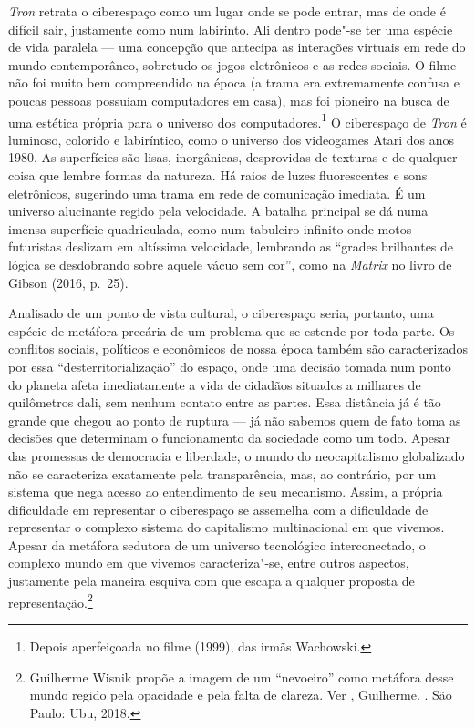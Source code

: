 \emph{Tron} retrata o ciberespaço como um lugar onde se pode entrar, mas
de onde é difícil sair, justamente como num labirinto. Ali dentro
pode"-se ter uma espécie de vida paralela --- uma concepção que antecipa
as interações virtuais em rede do mundo contemporâneo, sobretudo os
jogos eletrônicos e as redes sociais. O filme não foi muito bem
compreendido na época (a trama era extremamente confusa e poucas pessoas
possuíam computadores em casa), mas foi pioneiro na busca de uma
estética própria para o universo dos computadores.\footnote{Depois
  aperfeiçoada no filme {} (1999), das irmãs Wachowski.} O
ciberespaço de \emph{Tron} é luminoso, colorido e labiríntico, como o
universo dos videogames Atari dos anos 1980. As superfícies são lisas,
inorgânicas, desprovidas de texturas e de qualquer coisa que lembre
formas da natureza. Há raios de luzes fluorescentes e sons eletrônicos,
sugerindo uma trama em rede de comunicação imediata. É um universo
alucinante regido pela velocidade. A batalha principal se dá numa imensa
superfície quadriculada, como num tabuleiro infinito onde motos
futuristas deslizam em altíssima velocidade, lembrando as ``grades
brilhantes de lógica se desdobrando sobre aquele vácuo sem cor'', como
na \emph{Matrix} no livro de Gibson (2016, p.~25).

Analisado de um ponto de vista cultural, o ciberespaço seria, portanto, uma
espécie de metáfora precária de um problema que se estende por toda
parte. Os conflitos sociais, políticos e econômicos de nossa época
também são caracterizados por essa ``desterritorialização'' do espaço,
onde uma decisão tomada num ponto do planeta afeta imediatamente a vida
de cidadãos situados a milhares de quilômetros dali, sem nenhum contato
entre as partes. Essa distância já é tão grande que chegou ao ponto de
ruptura --- já não sabemos quem de fato toma as decisões que determinam o
funcionamento da sociedade como um todo. Apesar das promessas de
democracia e liberdade, o mundo do neocapitalismo globalizado não se
caracteriza exatamente pela transparência, mas, ao contrário, por um
sistema que nega acesso ao entendimento de seu mecanismo. Assim, a
própria dificuldade em representar o ciberespaço se assemelha com a
dificuldade de representar o complexo sistema do capitalismo
multinacional em que vivemos. Apesar da metáfora sedutora de um universo
tecnológico interconectado, o complexo mundo em que vivemos
caracteriza"-se, entre outros aspectos, justamente pela maneira esquiva
com que escapa a qualquer proposta de representação.\footnote{Guilherme
  Wisnik propõe a imagem de um ``nevoeiro'' como metáfora desse mundo
  regido pela opacidade e pela falta de clareza. Ver , Guilherme.
  {}. São
  Paulo: Ubu, 2018.}

